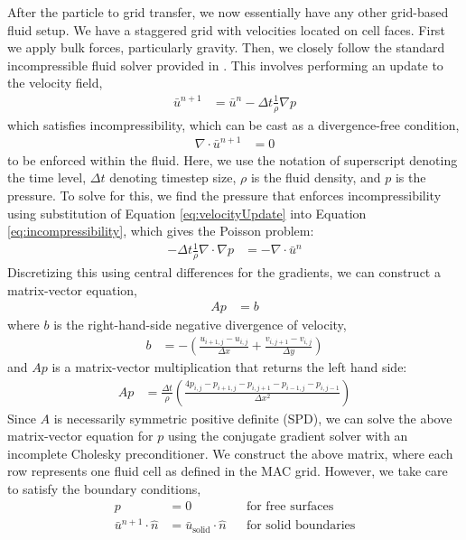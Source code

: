 \documentclass[sigconf]{acmart}
\begin{document}
After the particle to grid transfer, we now essentially have any other grid-based fluid setup. We have a staggered grid with velocities located on cell faces. First we apply bulk forces, particularly gravity. Then, we closely follow the standard incompressible fluid solver provided in \cite{bridson2015}. This involves performing an update to the velocity field,
\begin{align}
  \bar{u}^{n+1} &= \bar{u}^n - \Delta{}t\frac{1}{\rho}\nabla{}p \label{eq:velocityUpdate}
\end{align}
which satisfies incompressibility, which can be cast as a divergence-free condition,
\begin{align}
  \nabla{}\cdot{}\bar{u}^{n+1} &= 0 \label{eq:incompressibility}
\end{align}
to be enforced within the fluid. Here, we use the notation of superscript denoting the time level, $\Delta{}t$ denoting timestep size, $\rho$ is the fluid density, and $p$ is the pressure. To solve for this, we find the pressure that enforces incompressibility using substitution of Equation \ref{eq:velocityUpdate} into Equation \ref{eq:incompressibility}, which gives the Poisson problem:
\begin{align}
  -\Delta{}t\frac{1}{\rho}\nabla\cdot\nabla{}p &= -\nabla\cdot{}\bar{u}^n
\end{align}
Discretizing this using central differences for the gradients, we can construct a matrix-vector equation,
\begin{align}
  Ap &= b
\end{align}
where $b$ is the right-hand-side negative divergence of velocity,
\begin{align}
  b &= -\left(\frac{u_{i+1,j}-u_{i,j}}{\Delta{}x} + \frac{v_{i,j+1}-v_{i,j}}{\Delta{}y}\right) \label{eq:rhs}
\end{align}
and $Ap$ is a matrix-vector multiplication that returns the left hand side:
\begin{align}
  Ap &= \frac{\Delta{}t}{\rho}\left( \frac{4p_{i,j} - p_{i+1,j} - p_{i,j+1} - p_{i-1,j} - p_{i,j-1} }{\Delta{}x^2} \right) \label{eq:lhs}
\end{align}
Since $A$ is necessarily symmetric positive definite (SPD), we can solve the above matrix-vector equation for $p$ using the conjugate gradient solver with an incomplete Cholesky preconditioner. We construct the above matrix, where each row represents one fluid cell as defined in the MAC grid. However, we take care to satisfy the boundary conditions,
\begin{align}
  p &= 0 && \text{for free surfaces} \\
  \bar{u}^{n+1} \cdot{} \hat{n} &= \bar{u}_{\text{solid}}\cdot \hat{n} && \text{for solid boundaries}
\end{align}
\end{document}
